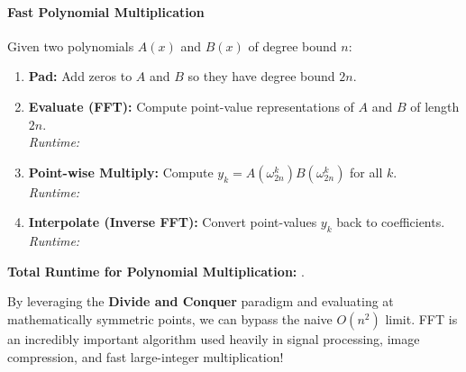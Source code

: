 \documentclass[11  pt]{article}
\begin{document}
\paragraph{Fast Polynomial Multiplication}

Given two polynomials $A(x)$ and $B(x)$ of degree bound $n$:
\begin{enumerate}
    \setlength\itemsep{2em}
    \item \textbf{Pad:} Add zeros to $A$ and $B$ so they have degree bound $2n$.
    \item \textbf{Evaluate (FFT):} Compute point-value representations of $A$ and $B$ of length $2n$. \\ \textit{Runtime: }
    \item \textbf{Point-wise Multiply:} Compute $y_k = A(\omega_{2n}^k) B(\omega_{2n}^k)$ for all $k$. \\ \textit{Runtime: }
    \item \textbf{Interpolate (Inverse FFT):} Convert point-values $y_k$ back to coefficients. \\ \textit{Runtime: }
\end{enumerate}

\vs{1cm}

\textbf{Total Runtime for Polynomial Multiplication:} . \\

\vs{0.5cm}

By leveraging the \textbf{Divide and Conquer} paradigm and evaluating at mathematically symmetric points, we can bypass the naive $O(n^2)$ limit. FFT is an incredibly important algorithm used heavily in signal processing, image compression, and fast large-integer multiplication!
\end{document}
